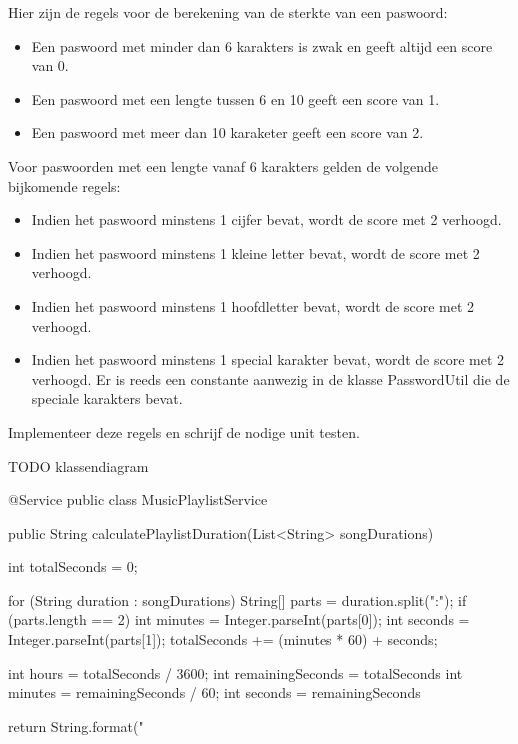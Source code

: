 \begin{oefening}
Hier zijn de regels voor de berekening van de sterkte van een paswoord:
\begin{itemize}
\item Een paswoord met minder dan 6 karakters is zwak en geeft altijd een score van 0.
\item Een paswoord met een lengte tussen 6 en 10 geeft een score van 1.
\item Een paswoord met meer dan 10 karaketer geeft een score van 2.
\end{itemize}
Voor paswoorden met een lengte vanaf 6 karakters gelden de volgende bijkomende regels:
\begin{itemize}
\item Indien het paswoord minstens 1 cijfer bevat, wordt de score met 2 verhoogd.
\item Indien het paswoord minstens 1 kleine letter bevat, wordt de score met 2 verhoogd.
\item Indien het paswoord minstens 1 hoofdletter bevat, wordt de score met 2 verhoogd.
\item Indien het paswoord minstens 1 special karakter bevat, wordt de score met 2 verhoogd. Er is reeds een constante aanwezig in de klasse PasswordUtil die de speciale karakters bevat.
\end{itemize}
Implementeer deze regels en schrijf de nodige unit testen.
\end{oefening}

TODO klassendiagram



@Service
public class MusicPlaylistService {

    public String calculatePlaylistDuration(List<String> songDurations) {
        int totalSeconds = 0;

        for (String duration : songDurations) {
            String[] parts = duration.split(":");
            if (parts.length == 2) {
                int minutes = Integer.parseInt(parts[0]);
                int seconds = Integer.parseInt(parts[1]);
                totalSeconds += (minutes * 60) + seconds;
            }
        }

        int hours = totalSeconds / 3600;
        int remainingSeconds = totalSeconds %
        int minutes = remainingSeconds / 60;
        int seconds = remainingSeconds %

        return String.format("%
    }
}
